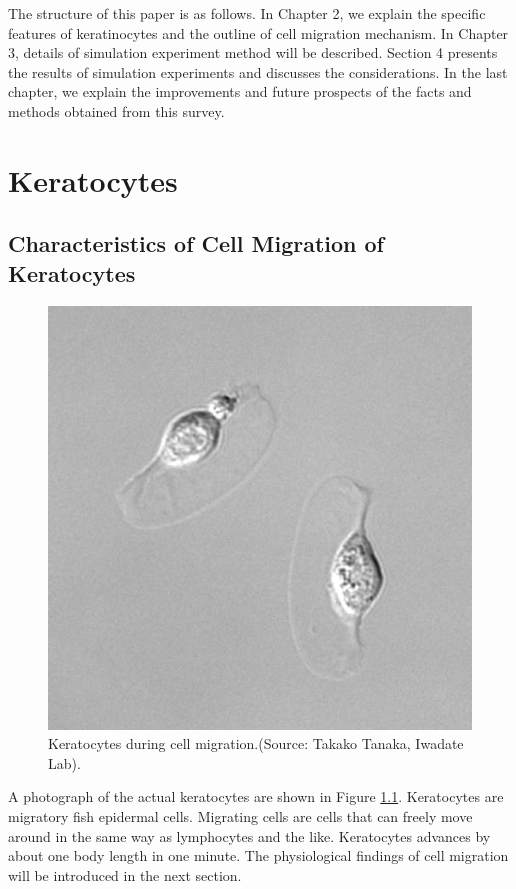 \documentclass[a4paper,12pt]{book}
\begin{document}
The structure of this paper is as follows. In Chapter 2, we explain the specific features of keratinocytes and the outline of cell migration mechanism. In Chapter 3, details of simulation experiment method will be described. Section 4 presents the results of simulation experiments and discusses the considerations. In the last chapter, we explain the improvements and future prospects of the facts and methods obtained from this survey.

\chapter{Keratocytes}
\section{Characteristics of Cell Migration of Keratocytes}
\begin{figure}[tbp]
\centering
\includegraphics[scale=0.4]{kera.eps}
\caption{Keratocytes during cell migration.(Source: Takako Tanaka, Iwadate Lab).}
\label{fig:kera}
\end{figure}

A photograph of the actual keratocytes are shown in Figure \ref{fig:kera}. Keratocytes are migratory fish epidermal cells. Migrating cells are cells that can freely move around in the same way as lymphocytes and the like. Keratocytes advances by about one body length in one minute. The physiological findings of cell migration will be introduced in the next section.
\end{document}
